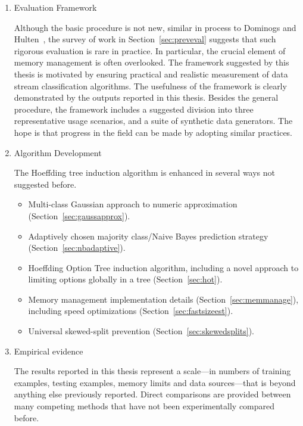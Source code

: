 \begin{enumerate}
\item Evaluation Framework

Although the basic procedure is not new, similar in process to Dominogs and Hulten~\cite{vfdt}, the survey of work in Section~\ref{sec:preveval} suggests that such rigorous evaluation is rare in practice. In particular, the crucial element of memory management is often overlooked. The framework suggested by this thesis is motivated by ensuring practical and realistic measurement of data stream classification algorithms. The usefulness of the framework is clearly demonstrated by the outputs reported in this thesis. Besides the general procedure, the framework includes a suggested division into three representative usage scenarios, and a suite of synthetic data generators. The hope is that progress in the field can be made by adopting similar practices.

\item Algorithm Development

The Hoeffding tree induction algorithm is enhanced in several ways not suggested before.

\begin{itemize}
\item Multi-class Gaussian approach to numeric approximation\\(Section~\ref{sec:gaussapprox}).
\item Adaptively chosen majority class/Naive Bayes prediction strategy (Section~\ref{sec:nbadaptive}).
\item Hoeffding Option Tree induction algorithm, including a novel approach to limiting options globally in a tree (Section~\ref{sec:hot}).
\item Memory management implementation details (Section~\ref{sec:memmanage}), including speed optimizations (Section~\ref{sec:fastsizeest}).
\item Universal skewed-split prevention (Section~\ref{sec:skewedsplits}).
\end{itemize}

\item Empirical evidence

The results reported in this thesis represent a scale---in numbers of training examples, testing examples, memory limits and data sources---that is beyond anything else previously reported. Direct comparisons are provided between many competing methods that have not been experimentally compared before.


\end{enumerate}
